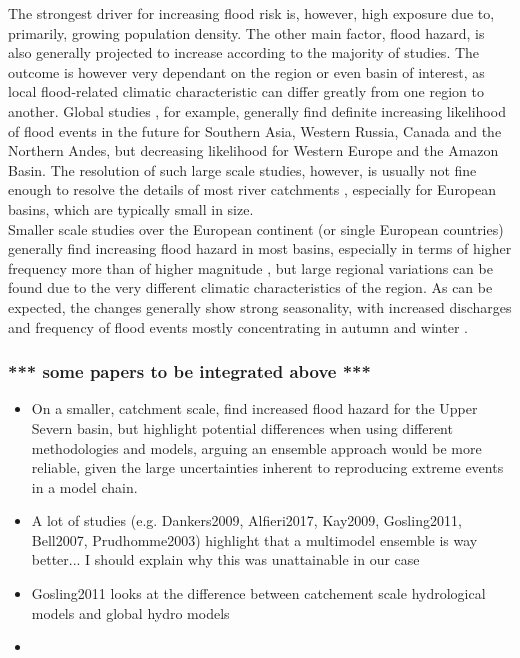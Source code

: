 The strongest driver for increasing flood risk is, however, high exposure due to, primarily, growing population density. The other main factor, flood hazard, is also generally projected to increase according to the majority of studies. The outcome is however very dependant on the region or even basin of interest, as local flood-related climatic characteristic can differ greatly from one region to another. Global studies \citep{Hirabayashi2013, Arnell2016, Dankers2014, Hirabayashi2008, Alfieri2017, Milly2002}, for example, generally find definite increasing likelihood of flood events in the future for Southern Asia, Western Russia, Canada and the Northern Andes, but decreasing likelihood for Western Europe and the Amazon Basin. The resolution of such large scale studies, however, is usually not fine enough to resolve the details of most river catchments \citep{Whitfield2012, Gosling2011}, especially for European basins, which are typically small in size.\\
Smaller scale studies \citep[e.g.][]{Dankers2009, Alfieri2015a, Prudhomme2003} over the European continent (or single European countries) generally find increasing flood hazard in most basins, especially in terms of higher frequency more than of higher magnitude \citep{Alfieri2015a, Lehner2006}, but large regional variations can be found \citep{Rojas2012} due to the very different climatic characteristics of the region. As can be expected, the changes generally show strong seasonality, with increased discharges and frequency of flood events mostly concentrating in autumn and winter \citep[e.g.][]{Middelkoop2001}.

\subsubsection{*** some papers to be integrated above ***}
\begin{itemize}
    \item  On a smaller, catchment scale, \citet{Cloke2013} find increased flood hazard for the Upper Severn basin, but highlight potential differences when using different methodologies and models, arguing an ensemble approach would be more reliable, given the large uncertainties inherent to reproducing extreme events in a model chain.
    \item A lot of studies (e.g. Dankers2009, Alfieri2017, Kay2009, Gosling2011, Bell2007, Prudhomme2003) highlight that a multimodel ensemble is way better... I should explain why this was unattainable in our case
    \item Gosling2011 looks at the difference between catchement scale hydrological models and global hydro models
    \item
\end{itemize}


